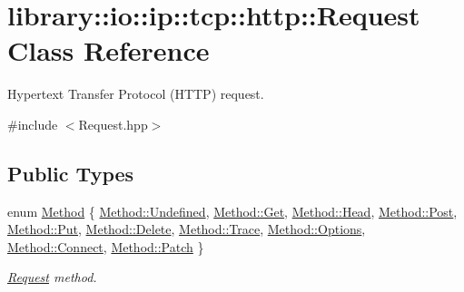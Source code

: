 \hypertarget{classlibrary_1_1io_1_1ip_1_1tcp_1_1http_1_1_request}{}\section{library\+:\+:io\+:\+:ip\+:\+:tcp\+:\+:http\+:\+:Request Class Reference}
\label{classlibrary_1_1io_1_1ip_1_1tcp_1_1http_1_1_request}


Hypertext Transfer Protocol (H\+T\+TP) request.  




{\ttfamily \#include $<$Request.\+hpp$>$}

\subsection*{Public Types}
\begin{DoxyCompactItemize}
\item 
enum \hyperlink{classlibrary_1_1io_1_1ip_1_1tcp_1_1http_1_1_request_a45baccf3aec384fbdbbf6ce411f11bd7}{Method} \{ \newline
\hyperlink{classlibrary_1_1io_1_1ip_1_1tcp_1_1http_1_1_request_a45baccf3aec384fbdbbf6ce411f11bd7aec0fc0100c4fc1ce4eea230c3dc10360}{Method\+::\+Undefined}, 
\hyperlink{classlibrary_1_1io_1_1ip_1_1tcp_1_1http_1_1_request_a45baccf3aec384fbdbbf6ce411f11bd7ac55582518cba2c464f29f5bae1c68def}{Method\+::\+Get}, 
\hyperlink{classlibrary_1_1io_1_1ip_1_1tcp_1_1http_1_1_request_a45baccf3aec384fbdbbf6ce411f11bd7a98921133d10fbdb0fb6dbb7b2648befe}{Method\+::\+Head}, 
\hyperlink{classlibrary_1_1io_1_1ip_1_1tcp_1_1http_1_1_request_a45baccf3aec384fbdbbf6ce411f11bd7a03d947a2158373c3b9d74325850cb8b9}{Method\+::\+Post}, 
\newline
\hyperlink{classlibrary_1_1io_1_1ip_1_1tcp_1_1http_1_1_request_a45baccf3aec384fbdbbf6ce411f11bd7ad0bf1810982e9728fcf3ac444a015373}{Method\+::\+Put}, 
\hyperlink{classlibrary_1_1io_1_1ip_1_1tcp_1_1http_1_1_request_a45baccf3aec384fbdbbf6ce411f11bd7af2a6c498fb90ee345d997f888fce3b18}{Method\+::\+Delete}, 
\hyperlink{classlibrary_1_1io_1_1ip_1_1tcp_1_1http_1_1_request_a45baccf3aec384fbdbbf6ce411f11bd7add4ec0ac4e58f7c32a01244ae91150b1}{Method\+::\+Trace}, 
\hyperlink{classlibrary_1_1io_1_1ip_1_1tcp_1_1http_1_1_request_a45baccf3aec384fbdbbf6ce411f11bd7adae8ace18bdcbcc6ae5aece263e14fe8}{Method\+::\+Options}, 
\newline
\hyperlink{classlibrary_1_1io_1_1ip_1_1tcp_1_1http_1_1_request_a45baccf3aec384fbdbbf6ce411f11bd7a49ab28040dfa07f53544970c6d147e1e}{Method\+::\+Connect}, 
\hyperlink{classlibrary_1_1io_1_1ip_1_1tcp_1_1http_1_1_request_a45baccf3aec384fbdbbf6ce411f11bd7a156e10596fdc76ee5300bab931d89c0f}{Method\+::\+Patch}
 \}\begin{DoxyCompactList}\small\item\em \hyperlink{classlibrary_1_1io_1_1ip_1_1tcp_1_1http_1_1_request}{Request} method. \end{DoxyCompactList}
\end{DoxyCompactItemize}
